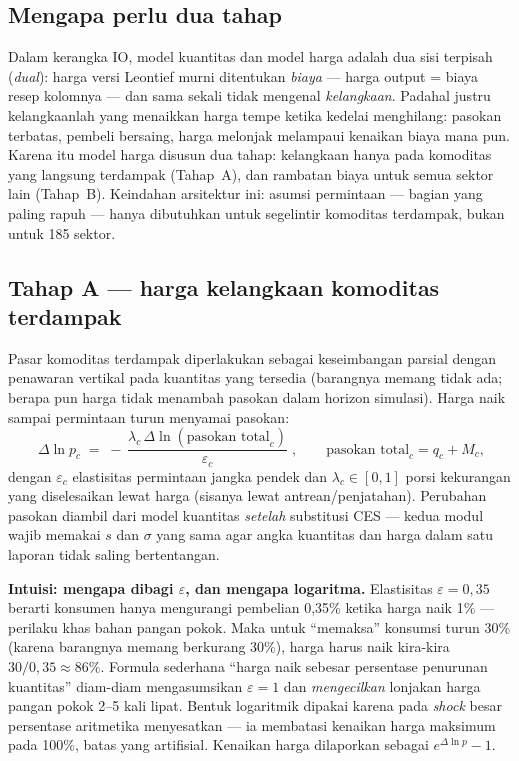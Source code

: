 \documentclass[11pt,a4paper]{article}
\newcommand{\en}[1]{\textit{#1}}   %
\begin{document}
\subsection{Mengapa perlu dua tahap}

Dalam kerangka IO, model kuantitas dan model harga adalah dua sisi
terpisah (\en{dual}): harga versi Leontief murni ditentukan \emph{biaya}
--- harga output = biaya resep kolomnya --- dan sama sekali tidak mengenal
\emph{kelangkaan}. Padahal justru kelangkaanlah yang menaikkan harga tempe
ketika kedelai menghilang: pasokan terbatas, pembeli bersaing, harga
melonjak melampaui kenaikan biaya mana pun. Karena itu model harga disusun
dua tahap: kelangkaan hanya pada komoditas yang langsung terdampak
(Tahap~A), dan rambatan biaya untuk semua sektor lain (Tahap~B). Keindahan
arsitektur ini: asumsi permintaan --- bagian yang paling rapuh --- hanya
dibutuhkan untuk segelintir komoditas terdampak, bukan untuk 185 sektor.

\subsection{Tahap A --- harga kelangkaan komoditas terdampak}

Pasar komoditas terdampak diperlakukan sebagai keseimbangan parsial dengan
penawaran vertikal pada kuantitas yang tersedia (barangnya memang tidak
ada; berapa pun harga tidak menambah pasokan dalam horizon simulasi).
Harga naik sampai permintaan turun menyamai pasokan:
\begin{equation}
\boxed{\;
\Delta \ln p_c \;=\; -\,\frac{\lambda_c \,\Delta \ln
(\text{pasokan total}_c)}{\varepsilon_c}
\;}, \qquad
\text{pasokan total}_c = q_c + M_c,
\label{eq:scarcity}
\end{equation}
dengan $\varepsilon_c$ elastisitas permintaan jangka pendek dan
$\lambda_c \in [0,1]$ porsi kekurangan yang diselesaikan lewat harga
(sisanya lewat antrean/penjatahan). Perubahan pasokan diambil dari model
kuantitas \emph{setelah} substitusi CES --- kedua modul wajib memakai $s$
dan $\sigma$ yang sama agar angka kuantitas dan harga dalam satu laporan
tidak saling bertentangan.

\begin{intuisi}
\textbf{Intuisi: mengapa dibagi $\varepsilon$, dan mengapa logaritma.}
Elastisitas $\varepsilon = 0{,}35$ berarti konsumen hanya mengurangi
pembelian 0{,}35\% ketika harga naik 1\% --- perilaku khas bahan pangan
pokok. Maka untuk ``memaksa'' konsumsi turun 30\% (karena barangnya memang
berkurang 30\%), harga harus naik kira-kira $30/0{,}35 \approx 86\%$.
Formula sederhana ``harga naik sebesar persentase penurunan kuantitas''
diam-diam mengasumsikan $\varepsilon = 1$ dan \emph{mengecilkan} lonjakan
harga pangan pokok 2--5 kali lipat. Bentuk logaritmik dipakai karena pada
\en{shock} besar persentase aritmetika menyesatkan --- ia membatasi
kenaikan harga maksimum pada 100\%, batas yang artifisial. Kenaikan harga
dilaporkan sebagai $e^{\Delta \ln p} - 1$.
\end{intuisi}
\end{document}
